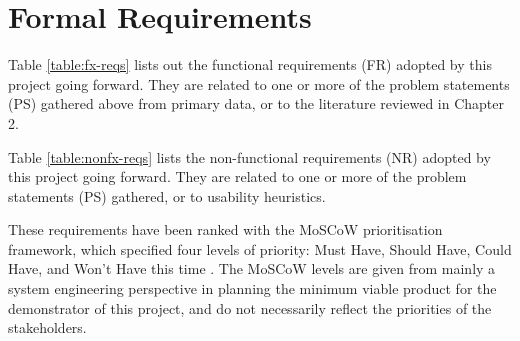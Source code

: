 \section{Formal Requirements}

Table \ref{table:fx-reqs} lists out the functional requirements (FR) adopted by this 
project going forward. They are related to one or more of the problem statements (PS) gathered 
above from primary data, or to the literature reviewed in Chapter 2. 

Table \ref{table:nonfx-reqs} lists the non-functional requirements (NR) adopted by this 
project going forward. They are related to one or more of the problem statements (PS) gathered, 
or to usability heuristics.

These requirements have been ranked with the MoSCoW prioritisation
framework, which specified four levels of priority: Must Have, Should Have, Could Have, and Won’t Have 
this time \citep{agile2018moscow}. The MoSCoW levels are given from mainly a system engineering perspective 
in planning the minimum viable product for the demonstrator of this project, 
and do not necessarily reflect the priorities of the stakeholders.

